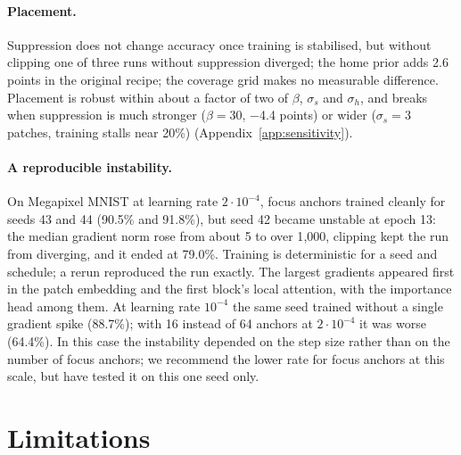 \documentclass[runningheads]{llncs}
\begin{document}
\paragraph{Placement.} Suppression does not change accuracy once training is stabilised, but
without clipping one of three runs without suppression diverged; the home prior adds 2.6 points
in the original recipe; the coverage grid makes no measurable difference. Placement is robust
within about a factor of two of $\beta$, $\sigma_s$ and $\sigma_h$, and breaks when suppression
is much stronger ($\beta=30$, $-$4.4 points) or wider ($\sigma_s=3$ patches, training stalls near
20\%) (Appendix~\ref{app:sensitivity}).

\paragraph{A reproducible instability.} On Megapixel MNIST at learning rate $2\cdot10^{-4}$, focus
anchors trained cleanly for seeds 43 and 44 (90.5\% and 91.8\%), but seed 42 became unstable at
epoch 13: the median gradient norm rose from about 5 to over 1{,}000, clipping kept the run from
diverging, and it ended at 79.0\%. Training is deterministic for a seed and schedule; a rerun
reproduced the run exactly. The largest gradients appeared first in the patch embedding and the
first block's local attention, with the importance head among them. At learning rate
$10^{-4}$ the same seed trained without a single gradient spike (88.7\%); with 16 instead of 64
anchors at $2\cdot10^{-4}$ it was worse (64.4\%). In this case the instability depended on the
step size rather than on the number of focus anchors; we recommend the lower rate for focus
anchors at this scale, but have tested it on this one seed only.

\section{Limitations}
\end{document}
